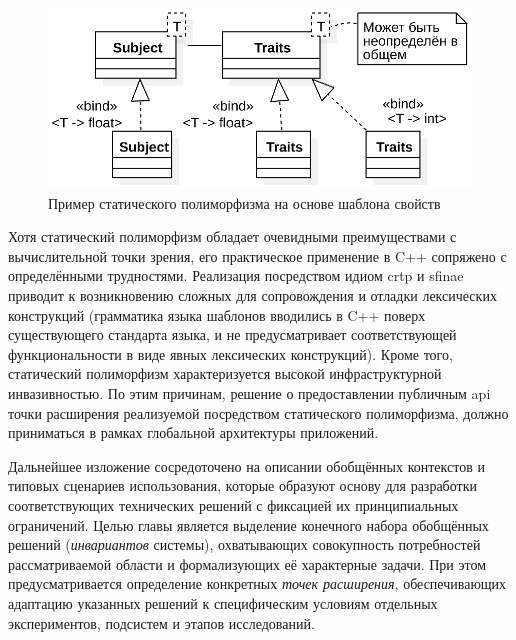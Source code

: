 \begin{figure}
    \centering
    \includegraphics[width=0.7\linewidth]{images/illustrative/static-polymorphism-example.eps}
    \caption{Пример статического полиморфизма на основе шаблона свойств}
    \label{fig:cpp-static-polymorphism-example}
\end{figure}

Хотя статический полиморфизм обладает очевидными преимуществами
с вычислительной точки зрения, его практическое применение в C++
сопряжено с определёнными трудностями. Реализация посредством идиом
\acrshort{crtp} и \acrshort{sfinae} приводит к возникновению сложных для сопровождения
и отладки лексических конструкций (грамматика
языка шаблонов вводились в C++ поверх существующего стандарта языка,
и не предусматривает соответствующей функциональности в виде
явных лексических конструкций).
Кроме того, статический полиморфизм характеризуется высокой
инфраструктурной инвазивностью.
По этим причинам,
решение о предоставлении публичным \acrshort{api} точки расширения
реализуемой посредством статического полиморфизма, должно приниматься
в рамках глобальной архитектуры приложений.


Дальнейшее изложение сосредоточено на описании обобщённых контекстов и типовых сценариев использования, которые образуют основу для разработки соответствующих технических решений с фиксацией их принципиальных ограничений. Целью главы является выделение конечного набора обобщённых решений (\emph{инвариантов} системы),
охватывающих совокупность потребностей рассматриваемой области и
формализующих её характерные задачи. При этом предусматривается
определение конкретных \emph{точек расширения}, обеспечивающих адаптацию
указанных решений к специфическим условиям отдельных экспериментов,
подсистем и этапов исследований.
